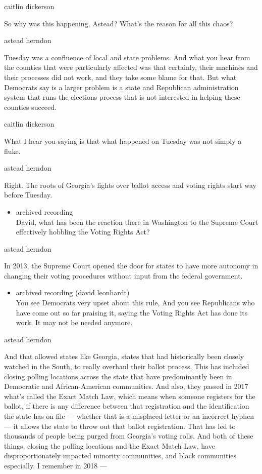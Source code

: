 caitlin dickerson

So why was this happening, Astead? What's the reason for all this chaos?

astead herndon

Tuesday was a confluence of local and state problems. And what you hear
from the counties that were particularly affected was that certainly,
their machines and their processes did not work, and they take some
blame for that. But what Democrats say is a larger problem is a state
and Republican administration system that runs the elections process
that is not interested in helping these counties succeed.

caitlin dickerson

What I hear you saying is that what happened on Tuesday was not simply a
fluke.

astead herndon

Right. The roots of Georgia's fights over ballot access and voting
rights start way before Tuesday.

\begin{itemize}
\tightlist
\item
  archived recording\\
  David, what has been the reaction there in Washington to the Supreme
  Court effectively hobbling the Voting Rights Act?
\end{itemize}

astead herndon

In 2013, the Supreme Court opened the door for states to have more
autonomy in changing their voting procedures without input from the
federal government.

\begin{itemize}
\tightlist
\item
  archived recording (david leonhardt)\\
  You see Democrats very upset about this rule, And you see Republicans
  who have come out so far praising it, saying the Voting Rights Act has
  done its work. It may not be needed anymore.
\end{itemize}

astead herndon

And that allowed states like Georgia, states that had historically been
closely watched in the South, to really overhaul their ballot process.
This has included closing polling locations across the state that have
predominantly been in Democratic and African-American communities. And
also, they passed in 2017 what's called the Exact Match Law, which means
when someone registers for the ballot, if there is any difference
between that registration and the identification the state has on file
--- whether that is a misplaced letter or an incorrect hyphen --- it
allows the state to throw out that ballot registration. That has led to
thousands of people being purged from Georgia's voting rolls. And both
of these things, closing the polling locations and the Exact Match Law,
have disproportionately impacted minority communities, and black
communities especially. I remember in 2018 ---

